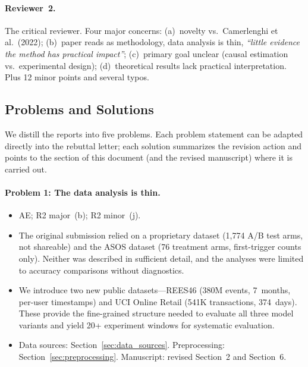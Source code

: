 \paragraph{Reviewer~2.}
The critical reviewer. Four major concerns:
(a)~novelty vs.\ Camerlenghi et al.\ (2022);
(b)~paper reads as methodology, data analysis is thin,
\emph{``little evidence the method has practical impact''};
(c)~primary goal unclear (causal estimation vs.\ experimental design);
(d)~theoretical results lack practical interpretation.
Plus 12 minor points and several typos.


\subsection{Problems and Solutions}
\label{subsec:problems}

We distill the reports into five problems.
Each problem statement can be adapted directly into the
rebuttal letter; each solution summarizes the revision action
and points to the section of this document (and the revised
manuscript) where it is carried out.

\paragraph{Problem 1: The data analysis is thin.}
\begin{itemize}[leftmargin=*]
  \item[\emph{Source:}] AE; R2 major~(b); R2 minor~(j).
  \item[\emph{Problem:}]
        The original submission relied on a proprietary dataset
        (1,774 A/B test arms, not shareable) and the ASOS dataset
        (76 treatment arms, first-trigger counts only).
        Neither was described in sufficient detail, and the analyses
        were limited to accuracy comparisons without diagnostics.
  \item[\emph{Solution:}]
        We introduce two new public datasets---REES46 (380M events,
        7~months, per-user timestamps) and UCI Online Retail
        (541K transactions, 374~days).
        These provide the fine-grained structure needed to evaluate
        all three model variants and yield 20+ experiment windows
        for systematic evaluation.
  \item[\emph{Where:}]
        Data sources: Section~\ref{sec:data_sources}.
        Preprocessing: Section~\ref{sec:preprocessing}.
        Manuscript: revised Section~2 and Section~6.
\end{itemize}

